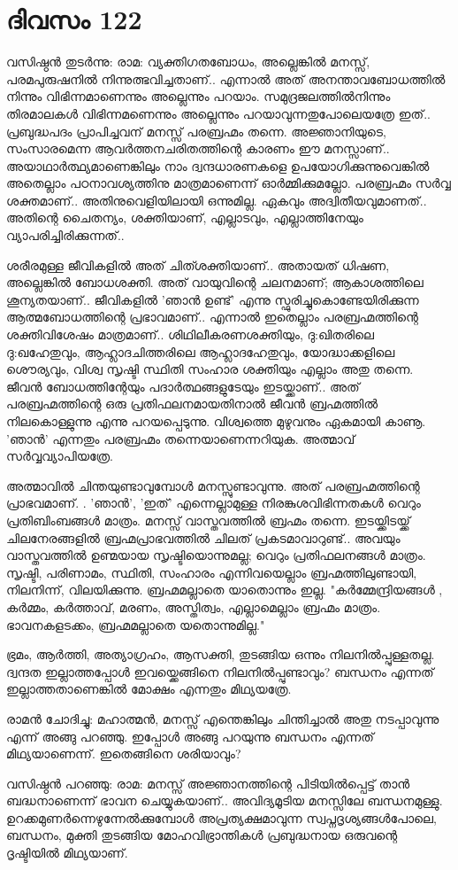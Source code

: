 \newpage
\section{ദിവസം 122}


വസിഷ്ഠന്‍ തുടര്‍ന്നു: രാമ: വ്യക്തിഗതബോധം, അല്ലെങ്കില്‍ മനസ്സ്‌, പരമപുരുഷനില്‍ നിന്നുത്ഭവിച്ചതാണ്‌.. എന്നാല്‍ അത്‌ അനന്താവബോധത്തില്‍ നിന്നും വിഭിന്നമാണെന്നും അല്ലെന്നും പറയാം. സമുദ്രജലത്തില്‍നിന്നും തിരമാലകള്‍ വിഭിന്നമണെന്നും അല്ലെന്നും പറയാവുന്നതുപോലെയത്രേ ഇത്‌.. പ്രബുദ്ധപദം പ്രാപിച്ചവന്‌ മനസ്സ്‌ പരബ്രഹ്മം തന്നെ. അജ്ഞാനിയുടെ, സംസാരമെന്ന ആവര്‍ത്തനചരിതത്തിന്റെ കാരണം ഈ മനസ്സാണ്‌.. അയാഥാര്‍ത്ഥ്യമാണെങ്കിലും നാം ദ്വന്ദധാരണകളെ ഉപയോഗിക്കുന്നുവെങ്കില്‍ അതെല്ലാം പഠനാവശ്യത്തിനു മാത്രമാണെന്ന് ഓര്‍മ്മിക്കുമല്ലോ. പരബ്രഹ്മം സര്‍വ്വ ശക്തമാണ്‌.. അതിനുവെളിയിലായി ഒന്നുമില്ല. ഏകവും അദ്വിതീയവുമാണത്‌.. അതിന്റെ ചൈതന്യം, ശക്തിയാണ്‌, എല്ലാടവും, എല്ലാത്തിനേയും വ്യാപരിച്ചിരിക്കുന്നത്‌..

ശരീരമുള്ള ജീവികളില്‍ അത്‌ ചിത്ശക്തിയാണ്‌.. അതായത്‌ ധിഷണ, അല്ലെങ്കില്‍ ബോധശക്തി. അത്‌ വായുവിന്റെ ചലനമാണ്‌; ആകാശത്തിലെ ശൂന്യതയാണ്‌.. ജീവികളില്‍ 'ഞാന്‍ ഉണ്ട്‌' എന്നു സ്ഫുരിച്ചുകൊണ്ടേയിരിക്കുന്ന ആത്മബോധത്തിന്റെ പ്രഭാവമാണ്‌.. എന്നാല്‍ ഇതെല്ലാം പരബ്രഹ്മത്തിന്റെ ശക്തിവിശേഷം മാത്രമാണ്‌.. ശിഥിലീകരണശക്തിയും, ദു:ഖിതരിലെ ദു:ഖഹേതുവും, ആഹ്ലാദചിത്തരിലെ ആഹ്ലാദഹേതുവും, യോദ്ധാക്കളിലെ ശൌര്യവും, വിശ്വ സൃഷ്ടി സ്ഥിതി സംഹാര ശക്തിയും എല്ലാം അതു തന്നെ. ജീവന്‍ ബോധത്തിന്റേയും പദാര്‍ത്ഥങ്ങളുടേയും ഇടയ്ക്കാണ്‌.. അത്‌ പരബ്രഹ്മത്തിന്റെ ഒരു പ്രതിഫലനമായതിനാല്‍ ജീവന്‍ ബ്രഹ്മത്തില്‍ നിലകൊള്ളുന്നു എന്നു പറയപ്പെടുന്നു. വിശ്വത്തെ മുഴുവനും ഏകമായി കാണൂ. 'ഞാന്‍' എന്നതും പരബ്രഹ്മം തന്നെയാണെന്നറിയുക. അത്മാവ്‌ സര്‍വ്വവ്യാപിയത്രേ.

അത്മാവില്‍ ചിന്തയുണ്ടാവുമ്പോള്‍ മനസ്സുണ്ടാവുന്നു. അത്‌ പരബ്രഹ്മത്തിന്റെ പ്രാഭവമാണ്‌. . 'ഞാന്‍', 'ഇത്‌' എന്നെല്ലാമുള്ള നിരങ്കുശവിഭിന്നതകള്‍ വെറും പ്രതിബിംബങ്ങള്‍ മാത്രം. മനസ്സ്‌ വാസ്തവത്തില്‍ ബ്രഹ്മം തന്നെ. ഇടയ്ക്കിടയ്ക്ക്‌ ചിലനേരങ്ങളില്‍ ബ്രഹ്മപ്രാഭവത്തില്‍ ചിലത്‌ പ്രകടമാവാറുണ്ട്‌.. അവയും വാസ്തവത്തില്‍ ഉണ്മയായ സൃഷ്ടിയൊന്നുമല്ല; വെറും പ്രതിഫലനങ്ങള്‍ മാത്രം. സൃഷ്ടി, പരിണാമം, സ്ഥിതി, സംഹാരം എന്നിവയെല്ലാം ബ്രഹ്മത്തിലുണ്ടായി, നിലനിന്ന്, വിലയിക്കുന്നു. ബ്രഹ്മമല്ലാതെ യാതൊന്നും ഇല്ല. "കര്‍മ്മേന്ദ്രിയങ്ങള്‍ , കര്‍മ്മം, കര്‍ത്താവ്‌, മരണം, അസ്തിത്വം, എല്ലാമെല്ലാം ബ്രഹ്മം മാത്രം. ഭാവനകളടക്കം, ബ്രഹ്മമല്ലാതെ യതൊന്നുമില്ല."

ഭ്രമം, ആര്‍ത്തി, അത്യാഗ്രഹം, ആസക്തി, തുടങ്ങിയ ഒന്നും നിലനില്‍പ്പുള്ളതല്ല. ദ്വന്ദത ഇല്ലാത്തപ്പോള്‍ ഇവയ്ക്കെങ്ങിനെ നിലനില്‍പ്പുണ്ടാവും? ബന്ധനം എന്നത്‌ ഇല്ലാത്തതാണെങ്കില്‍ മോക്ഷം എന്നതും മിഥ്യയത്രേ.

രാമന്‍ ചോദിച്ചു: മഹാത്മന്‍, മനസ്സ്‌ എന്തെങ്കിലും ചിന്തിച്ചാല്‍ അതു നടപ്പാവുന്നു എന്ന് അങ്ങു പറഞ്ഞു. ഇപ്പോള്‍ അങ്ങു പറയുന്നു ബന്ധനം എന്നത്‌ മിഥ്യയാണെന്ന്. ഇതെങ്ങിനെ ശരിയാവും?

വസിഷ്ഠന്‍ പറഞ്ഞു: രാമ: മനസ്സ്‌ അജ്ഞാനത്തിന്റെ പിടിയില്‍പ്പെട്ട്‌ താന്‍ ബദ്ധനാണെന്ന് ഭാവന ചെയ്യുകയാണ്‌.. അവിദ്യമൂടിയ മനസ്സിലേ ബന്ധനമുള്ളു. ഉറക്കമുണര്‍ന്നെഴുന്നേല്‍ക്കുമ്പോള്‍ അപ്രത്യക്ഷമാവുന്ന സ്വപ്നദൃശ്യങ്ങള്‍പോലെ, ബന്ധനം, മുക്തി തുടങ്ങിയ മോഹവിഭ്രാന്തികള്‍ പ്രബുദ്ധനായ ഒരുവന്റെ ദൃഷ്ടിയില്‍ മിഥ്യയാണ്‌.

